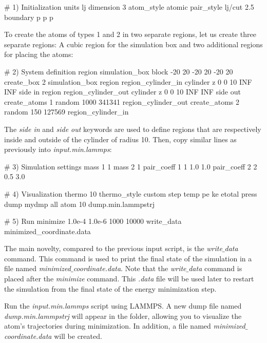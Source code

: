 \begin{lcverbatim}
# 1) Initialization
units lj
dimension 3
atom_style atomic
pair_style lj/cut 2.5
boundary p p p
\end{lcverbatim}

\noindent To create the atoms of types 1 and 2 in two separate
regions, let us create three separate regions: A cubic region
for the simulation box and two additional regions for placing the atoms:

\begin{lcverbatim}
# 2) System definition
region simulation_box block -20 20 -20 20 -20 20
create_box 2 simulation_box
region region_cylinder_in cylinder z 0 0 10 INF INF side in
region region_cylinder_out cylinder z 0 0 10 INF INF side out
create_atoms 1 random 1000 341341 region_cylinder_out
create_atoms 2 random 150 127569 region_cylinder_in
\end{lcverbatim}

\noindent The \textit{side in} and \textit{side out} keywords
are used to define regions that are respectively inside
and outside of the cylinder of radius 10. Then, copy similar lines
as previously into \textit{input.min.lammps}:

\begin{lcverbatim}
# 3) Simulation settings
mass 1 1
mass 2 1
pair_coeff 1 1 1.0 1.0
pair_coeff 2 2 0.5 3.0

# 4) Visualization
thermo 10
thermo_style custom step temp pe ke etotal press
dump mydmp all atom 10 dump.min.lammpstrj

# 5) Run
minimize 1.0e-4 1.0e-6 1000 10000
write_data minimized_coordinate.data
\end{lcverbatim}

\noindent The main novelty, compared to the previous input script, is the \textit{write$\_$data}
command. This command is used to print the final state of the simulation in
a file named \textit{minimized$\_$coordinate.data}. Note that the \textit{write$\_$data} command
is placed after the \textit{minimize} command. This \textit{.data} file will be used later
to restart the simulation from the final state of the energy minimization step.

\vspace{0.25cm} \noindent Run the \textit{input.min.lammps} script using LAMMPS. A new dump file named
\textit{dump.min.lammpstrj} will appear in the folder, allowing you to visualize
the atom's trajectories during minimization. In
addition, a file named \textit{minimized$\_$coordinate.data} will be created. 

